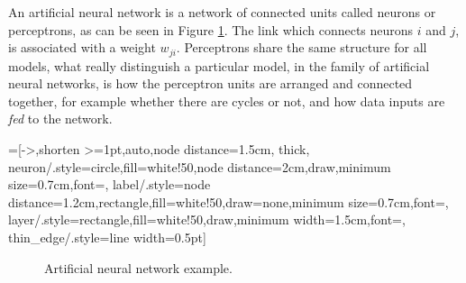  
An artificial neural network is a network of connected units called neurons or perceptrons, as can be seen in Figure \ref{fully_connected}. The link which connects neurons $i$ and $j$, is associated with a weight $w_{ji}$. Perceptrons share the same
structure for all models, what really distinguish a particular model, in the family of artificial neural networks, is how the perceptron units are arranged and connected together, for example whether there are cycles
or not, and how data inputs are \textit{fed} to the network. 

=[->,shorten >=1pt,auto,node distance=1.5cm,
  thick,
  neuron/.style={circle,fill=white!50,node distance=2cm,draw,minimum size=0.7cm,font=\sffamily\normalsize},
  label/.style={node distance=1.2cm,rectangle,fill=white!50,draw=none,minimum size=0.7cm,font=\sffamily\normalsize},
  layer/.style={rectangle,fill=white!50,draw,minimum width=1.5cm,font=\sffamily\Large},
  thin_edge/.style={line width=0.5pt}]
\begin{figure}[h]
 \centering
{}
\caption{Artificial neural network example.}
\label{fully_connected}
\end{figure}

